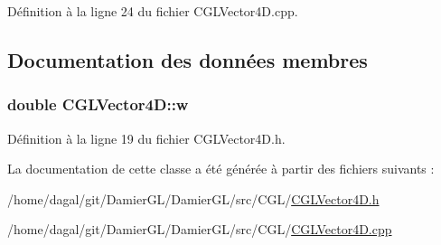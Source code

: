 Définition à la ligne 24 du fichier C\-G\-L\-Vector4\-D.\-cpp.



\subsection{Documentation des données membres}
\hypertarget{class_c_g_l_vector4_d_ab9e3f6bb008e5c33aab6c847b7ad21a9}{
\subsubsection[{w}]{\setlength{\rightskip}{0pt plus 5cm}double C\-G\-L\-Vector4\-D\-::w\hspace{0.3cm}{\ttfamily [protected]}}}\label{class_c_g_l_vector4_d_ab9e3f6bb008e5c33aab6c847b7ad21a9}


Définition à la ligne 19 du fichier C\-G\-L\-Vector4\-D.\-h.



La documentation de cette classe a été générée à partir des fichiers suivants \-:\begin{DoxyCompactItemize}
\item 
/home/dagal/git/\-Damier\-G\-L/\-Damier\-G\-L/src/\-C\-G\-L/\hyperlink{_c_g_l_vector4_d_8h}{C\-G\-L\-Vector4\-D.\-h}\item 
/home/dagal/git/\-Damier\-G\-L/\-Damier\-G\-L/src/\-C\-G\-L/\hyperlink{_c_g_l_vector4_d_8cpp}{C\-G\-L\-Vector4\-D.\-cpp}\end{DoxyCompactItemize}
